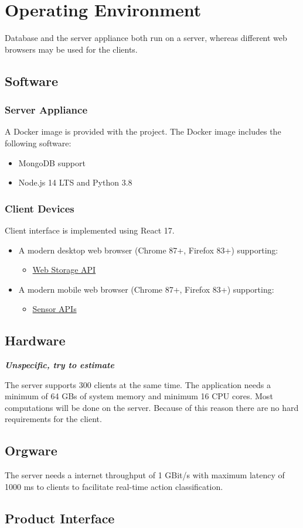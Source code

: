 \section{Operating Environment}

Database and the server appliance both run on a server, whereas different web browsers may be used for the clients.

\subsection{Software}
\subsubsection{Server Appliance}
A Docker image is provided with the project. The Docker image includes the following software:
\begin{itemize}
    \item MongoDB support
    \item Node.js 14 LTS and Python 3.8
\end{itemize}
\subsubsection{Client Devices}
Client interface is implemented using React 17.
\begin{itemize}
    \item A modern desktop web browser (Chrome 87+, Firefox 83+) supporting:
    \begin{itemize}
        \item \href{https://developer.mozilla.org/en-US/docs/Web/API/Web_Storage_API}{Web Storage API}
    \end{itemize}
    \item A modern mobile web browser (Chrome 87+, Firefox 83+) supporting:
    \begin{itemize}
        \item \href{https://developer.mozilla.org/en-US/docs/Web/API/Sensor_APIs}{Sensor APIs}
    \end{itemize}
\end{itemize}

\subsection{Hardware}
\textbf{\emph{Unspecific, try to estimate}}

The server supports 300 clients at the same time. The application needs a minimum of 64 GBs of system memory and minimum 16 CPU cores. Most computations will be done on the server. Because of this reason there are no hard requirements for the client.

\subsection{Orgware}
The server needs a internet throughput of 1 GBit/s with maximum latency of 1000 ms to clients to facilitate real-time action classification.

\subsection{Product Interface}
